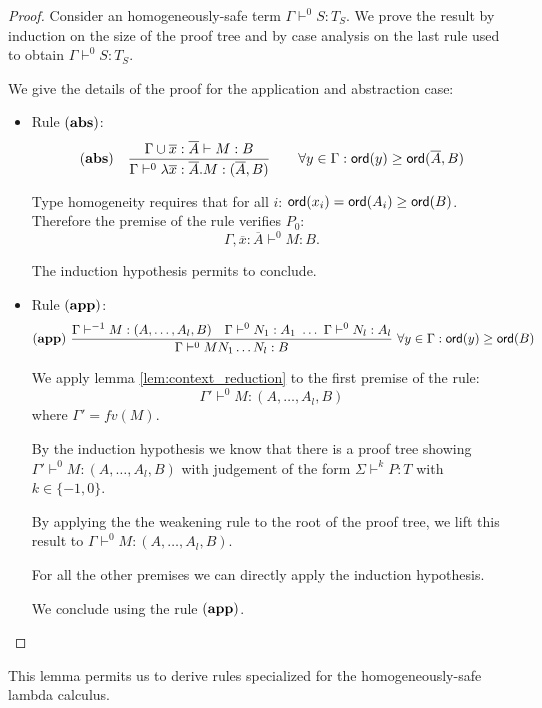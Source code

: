 \begin{proof}
Consider an homogeneously-safe term $\Gamma \vdash^{0} S : T_S$. We
prove the result by induction on the size of the proof tree and by
case analysis on the last rule used to obtain $\Gamma \vdash^{0} S :
T_S$.

We give the details of the proof for the application and abstraction
case:
\begin{itemize}
\item Rule $\mathbf{(abs)}$:
$$ \mathbf{(abs)} \quad  \frac{\displaystyle \Gamma \cup \overline{x} : \overline{A} \vdash M : B}{\Gamma  \vdash^{0} \lambda \overline{x} : \overline{A} . M : (\overline{A},B)} \qquad
                                   \forall y \in \Gamma : {\sf ord}(y) \geq {\sf ord}(\overline{A},B)$$

Type homogeneity requires that for all $i$: ${\sf ord}(x_i) = {\sf ord}(A_i) \geq
{\sf ord}(B)$. Therefore the premise of the rule verifies $P_0$:
$$\Gamma, \overline{x} : \overline{A} \vdash^0 M : B.$$

The induction hypothesis permits to conclude.

\item Rule $\mathbf{(app)}$:
$$ \mathbf{(app)} \ \frac{\displaystyle \Gamma \vdash^{-1} M : (A,\ldots,A_l,B)
                                        \quad \Gamma \vdash^{0} N_1 : A_1
                                        \  \ldots \ \Gamma \vdash^{0} N_l : A_l  }{\Gamma  \vdash^0 M N_1 \ldots N_l : B}
                                    \
                                   \forall y \in \Gamma : {\sf ord}(y) \geq {\sf ord}(B)$$

We apply lemma \ref{lem:context_reduction} to the first premise of the rule:
$$ \Gamma' \vdash^{0} M : (A,\ldots,A_l,B) $$
where $\Gamma' = fv(M)$.

By the induction hypothesis we know that there is a proof tree
showing $\Gamma' \vdash^{0} M : (A,\ldots,A_l,B)$ with judgement of
the form $\Sigma \vdash^{k} P : T$ with $k\in \{-1,0\}$.

By applying the the weakening rule to the root of the proof tree, we lift this result to $\Gamma
\vdash^{0} M : (A,\ldots,A_l,B)$.

For all the other premises we can directly apply the induction
hypothesis.

We conclude using the rule $\mathbf{(app)}$.
\end{itemize}
\end{proof}

This lemma permits us to derive rules specialized for the
homogeneously-safe lambda calculus.

